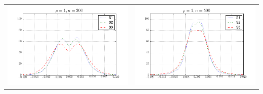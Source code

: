 \begin{table}[!ht]
{\begin{tabular}{c c}
\includegraphics[width=8cm]{scaled_density_200_1} & \includegraphics[width=8cm]{scaled_density_500_1} \\
\end{tabular}
}
\end{table}

